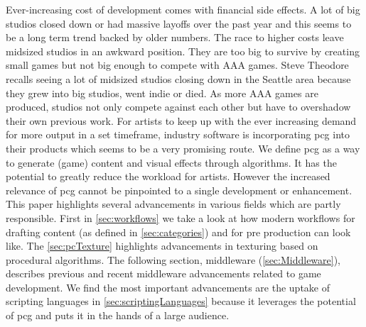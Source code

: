 \documentclass[10pt,a4paper]{article}
\begin{document}
\begin{multicols}{2}
Ever-increasing cost of development comes with financial side effects. A lot of big studios closed down or had massive layoffs over the past year \cite{Lahti2018, Schreier2019, Walker2019, Schreier2019a} and this seems to be a long term trend backed by older numbers\cite{Plunkett2012}. The race to higher costs leave midsized studios in an awkward position. They are too big to survive by creating small games but not big enough to compete with AAA games. Steve Theodore recalls seeing a lot of midsized studios closing down in the Seattle area because they grew into big studios, went indie or died\cite{Prinke2017}. As more AAA games are produced, studios not only compete against each other but have to overshadow their own previous work. For artists to keep up with the ever increasing demand for more output in a set timeframe, industry software is incorporating \gls{pcg} into their products which seems to be a very promising route. We define \gls{pcg} as a way to generate (game) content and visual effects through algorithms. It has the potential to greatly reduce the workload for artists. However the increased relevance of \gls{pcg} cannot be pinpointed to a single development or enhancement. This paper highlights several advancements in various fields which are partly responsible. First in \autoref{sec:workflows} we take a look at how modern workflows for drafting content (as defined in \autoref{sec:categories}) and for pre production can look like. The \autoref{sec:pcTexture} highlights advancements in texturing based on procedural algorithms. The following section, middleware (\autoref{sec:Middleware}), describes previous and recent middleware advancements related to game development. We find the most important advancements are the uptake of scripting languages in \autoref{sec:scriptingLanguages} because it leverages the potential of \gls{pcg} and puts it in the hands of a large audience.
\end{multicols}
\end{document}
